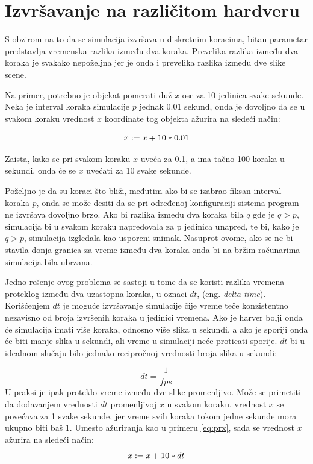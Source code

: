 \documentclass[12pt,oneside]{memoir}
\newtheorem{primer}{Primer}[section]
\begin{document}
\section{Izvršavanje na različitom hardveru}

S obzirom na to da se simulacija izvršava u diskretnim koracima,
bitan parametar predstavlja vremenska razlika između dva koraka.
Prevelika razlika između dva koraka je svakako nepoželjna jer je onda i prevelika razlika između dve slike scene.

Na primer, potrebno je objekat pomerati duž $x$ ose za 10 jedinica svake sekunde. Neka je interval koraka simulacije 
$p$ jednak $0.01$ sekund, onda je dovoljno da se u svakom koraku vrednost $x$ koordinate tog objekta ažurira na sledeći način:


\begin{equation}
	\label{eq:prx}
$$ x:= x + 10 * 0.01 $$
\end{equation}

Zaista, kako se pri svakom koraku $x$ uveća za 0.1, a ima tačno 100 koraka u sekundi, onda će se $x$ uvećati za 10 svake sekunde.

Poželjno je da su koraci što bliži, međutim ako bi se izabrao fiksan interval koraka $p$, onda se može desiti
da se pri određenoj konfiguraciji sistema program ne izvršava dovoljno brzo. 
Ako bi razlika između dva koraka bila $q$ gde je $q > p$, 
simulacija bi u svakom koraku napredovala za p jedinica unapred, te bi,
kako je $q > p$, simulacija izgledala kao usporeni snimak.
Nasuprot ovome, ako se ne bi stavila donja granica za vreme između dva koraka onda bi na bržim računarima
simulacija bila ubrzana. 

Jedno rešenje ovog problema se sastoji u tome da se koristi 
razlika vremena proteklog između dva uzastopna koraka, u oznaci $dt$, (eng. {\em delta time}).
Korišćenjem $dt$ je moguće izvršavanje simulacije čije vreme teče konzistentno nezavisno od broja izvršenih koraka u 
jedinici vremena. Ako je harver bolji onda će simulacija imati više koraka, odnosno više slika u sekundi, a ako je 
sporiji onda će biti manje slika u sekundi, ali vreme u simulaciji neće proticati sporije.
$dt$ bi u idealnom slučaju bilo jednako recipročnoj vrednosti broja slika u sekundi:


$$dt = \frac{1}{fps}$$
U praksi je ipak proteklo vreme između dve slike promenljivo.
Može se primetiti da dodavanjem vrednosti $dt$ promenljivoj $x$ u svakom koraku, vrednost $x$ se povećava 
za 1 svake sekunde, jer vreme svih koraka tokom jedne sekunde mora ukupno biti baš 1.
Umesto ažuriranja kao u primeru \ref{eq:prx}, sada se vrednost $x$ ažurira na sledeći način:
\begin{equation}
	\label{eq:prx}
	$$ x:= x + 10 * dt $$
\end{equation}
\end{document}
